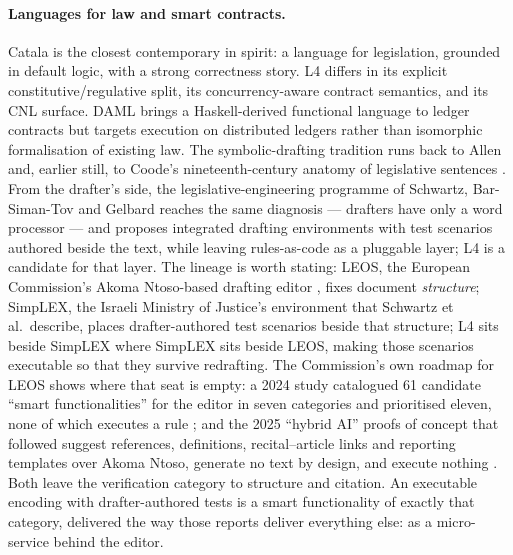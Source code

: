 \documentclass[sigconf,nonacm]{acmart}
\begin{document}
\paragraph{Languages for law and smart contracts.}
Catala \cite{merigoux2021catala} is the closest contemporary in spirit: a
language for legislation, grounded in default logic, with a strong
correctness story. L4 differs in its explicit constitutive/regulative split,
its concurrency-aware contract semantics, and its CNL surface. DAML
\cite{daml} brings a Haskell-derived functional language to ledger
contracts but targets execution on distributed ledgers rather than
isomorphic formalisation of existing law. The symbolic-drafting tradition
runs back to Allen \cite{allen1957symbolic} and, earlier still, to Coode's
nineteenth-century anatomy of legislative sentences \cite{coode1843}.
From the drafter's side, the legislative-engineering programme of Schwartz,
Bar-Siman-Tov and Gelbard
\cite{schwartz2023ilde,schwartz2025legislativeengineering} reaches the same
diagnosis --- drafters have only a word processor --- and proposes integrated
drafting environments with test scenarios authored beside the text, while
leaving rules-as-code as a pluggable layer; L4 is a candidate for that layer.
The lineage is worth stating: LEOS, the European Commission's Akoma
Ntoso-based drafting editor \cite{leos}, fixes document \emph{structure};
SimpLEX, the Israeli Ministry of Justice's environment that Schwartz et al.\
describe, places drafter-authored test scenarios beside that structure; L4
sits beside SimpLEX where SimpLEX sits beside LEOS, making those scenarios
executable so that they survive redrafting.
The Commission's own roadmap for LEOS shows where that seat is empty: a
2024 study catalogued 61 candidate ``smart functionalities'' for the editor
in seven categories and prioritised eleven, none of which executes a rule
\cite{fitsilis2024augmentedleos}; and the 2025 ``hybrid AI'' proofs of
concept that followed suggest references, definitions, recital--article
links and reporting templates over Akoma Ntoso, generate no text by design,
and execute nothing \cite{palmirani2025hybridleos}. Both leave the
verification category to structure and citation. An executable encoding
with drafter-authored tests is a smart functionality of exactly that
category, delivered the way those reports deliver everything else: as a
micro-service behind the editor.

\end{document}
